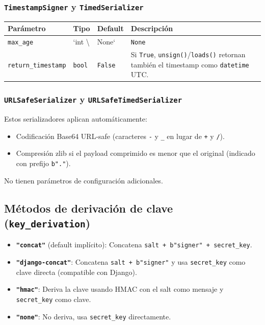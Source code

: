 \documentclass[11pt,a4paper]{article}
\begin{document}
\subsubsection*{\texttt{TimestampSigner} y \texttt{TimedSerializer}}


\begin{center}
\begin{tabular}{@{}llll@{}}
\toprule
Parámetro & Tipo & Default & Descripción \\
\midrule
\texttt{max\_age} & `int \textbackslash{} & None` & \texttt{None} \\
\texttt{return\_timestamp} & \texttt{bool} & \texttt{False} & Si \texttt{True}, \texttt{unsign()}/\texttt{loads()} retornan también el timestamp como \texttt{datetime} UTC. \\
\bottomrule
\end{tabular}
\end{center}



\subsubsection*{\texttt{URLSafeSerializer} y \texttt{URLSafeTimedSerializer}}


Estos serializadores aplican automáticamente:


\begin{itemize}[leftmargin=*,topsep=2pt,itemsep=1pt]
  \item Codificación Base64 URL-safe (caracteres \texttt{-} y \texttt{\_} en lugar de \texttt{+} y \texttt{/}).
  \item Compresión zlib si el payload comprimido es menor que el original (indicado con prefijo \texttt{b"."}).
\end{itemize}


No tienen parámetros de configuración adicionales.


\subsection*{Métodos de derivación de clave (\texttt{key\_derivation})}


\begin{itemize}[leftmargin=*,topsep=2pt,itemsep=1pt]
  \item \textbf{\texttt{"concat"}} (default implícito): Concatena \texttt{salt + b"signer" + secret\_key}.
  \item \textbf{\texttt{"django-concat"}}: Concatena \texttt{salt + b"signer"} y usa \texttt{secret\_key} como clave directa (compatible con Django).
  \item \textbf{\texttt{"hmac"}}: Deriva la clave usando HMAC con el salt como mensaje y \texttt{secret\_key} como clave.
  \item \textbf{\texttt{"none"}}: No deriva, usa \texttt{secret\_key} directamente.
\end{itemize}
\end{document}
